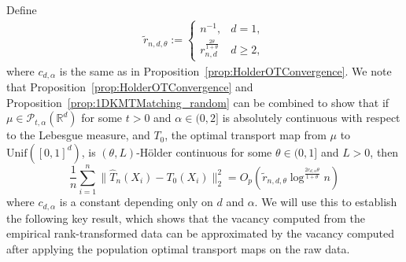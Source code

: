 \documentclass[11pt]{article}
\begin{document}
Define 
\begin{align*}
\tilde{r}_{n, d, \theta} := \begin{cases}
    n^{-1}, & d = 1, \\
    r_{n, d}^{\frac{2\theta}{1+\theta}}  & d \geq 2,
\end{cases}
\end{align*}
where $c_{d, \alpha}$ is the same as in Proposition~\ref{prop:HolderOTConvergence}. We note that  Proposition~\ref{prop:HolderOTConvergence} and Proposition~\ref{prop:1DKMTMatching_random} can be combined to show that if $\mu \in \mathcal{P}_{t, \alpha}(\mathbb{R}^d)$ for some $t > 0$ and $\alpha \in (0, 2]$ is absolutely continuous with respect to the Lebesgue measure, and $T_0$, the optimal transport map from $\mu$ to $\mathrm{Unif}([0, 1]^d)$, is $(\theta, L)$-H\"older continuous for some $\theta\in (0, 1]$ and $L >0$, then 
\begin{equation}
    \label{Eq:OT_convergence}
\frac{1}{n}\sum_{i = 1}^n\|\hat T_n(X_i) - T_0(X_i)\|_2^2 = O_p(\tilde{r}_{n,d,\theta}\log^{\frac{2c_{d, \alpha} \theta}{1 + \theta}} n)
\end{equation}
where $c_{d, \alpha}$ is a constant depending only on $d$ and $\alpha$.  We will use this to establish the following key result, which shows that the vacancy computed from the empirical rank-transformed data can be approximated by the vacancy computed after applying the population optimal transport maps on the raw data.
\end{document}
